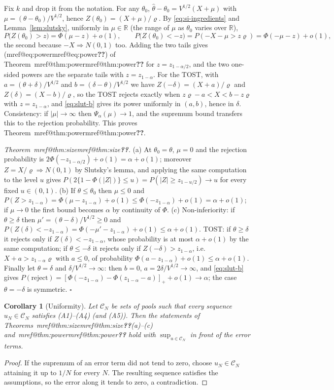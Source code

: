 \documentclass[pdflatex,sn-mathphys-num,iicol]{sn-jnl}
\makeatletter
\theoremstyle{thmstyleone}
\newtheorem{corollary}[proposition]{Corollary}
\theoremstyle{thmstyletwo}
\theoremstyle{thmstylethree}
\newcommand{\Mref}[1]{\ifcsname mref@#1\endcsname\csname mref@#1\endcsname\else\textbf{??}\fi}
\makeatother
\begin{document}
Fix $k$ and drop it from the notation. For any $\theta_0$, $\hat\theta-\theta_0=V^{1/2}(X+\mu)$ with $\mu=(\theta-\theta_0)/V^{1/2}$, hence $Z(\theta_0)=(X+\mu)/\varrho$. By \eqref{eq:si-ingredients} and Lemma~\ref{lem:slutsky}, uniformly in $\mu\in\mathbb R$ (the range of $\mu$ as $\theta_0$ varies over $\mathbb R$),
\[
P\big(Z(\theta_0)>z\big)=\Phi(\mu-z)+o(1),\qquad P\big(Z(\theta_0)<-z\big)=P(-X-\mu>z\varrho)=\Phi(-\mu-z)+o(1),
\]
the second because $-X\Rightarrow N(0,1)$ too. Adding the two tails gives (\Mref{eq:power}) of Theorem~\Mref{thm:power} for $z=z_{1-\alpha/2}$, and the two one-sided powers are the separate tails with $z=z_{1-\alpha}$. For the TOST, with $a=(\theta+\delta)/V^{1/2}$ and $b=(\delta-\theta)/V^{1/2}$ we have $Z(-\delta)=(X+a)/\varrho$ and $Z(\delta)=(X-b)/\varrho$, so the TOST rejects exactly when $z\varrho-a<X<b-z\varrho$ with $z=z_{1-\alpha}$, and \eqref{eq:slut-b} gives its power uniformly in $(a,b)$, hence in $\delta$. Consistency: if $|\mu|\to\infty$ then $\Psi_\alpha(\mu)\to1$, and the supremum bound transfers this to the rejection probability. This proves Theorem~\Mref{thm:power}.

\emph{Theorem~\Mref{thm:size}.} (a) At $\theta_0=\theta$, $\mu=0$ and the rejection probability is $2\Phi(-z_{1-\alpha/2})+o(1)=\alpha+o(1)$; moreover $Z=X/\varrho\Rightarrow N(0,1)$ by Slutsky's lemma, and applying the same computation to the level $u$ gives $P(2\{1-\Phi(|Z|)\}\le u)=P(|Z|\ge z_{1-u/2})\to u$ for every fixed $u\in(0,1)$. (b) If $\theta\le\theta_0$ then $\mu\le0$ and $P(Z>z_{1-\alpha})=\Phi(\mu-z_{1-\alpha})+o(1)\le\Phi(-z_{1-\alpha})+o(1)=\alpha+o(1)$; if $\mu\to0$ the first bound becomes $\alpha$ by continuity of $\Phi$. (c) Non-inferiority: if $\theta\ge\delta$ then $\mu'=(\theta-\delta)/V^{1/2}\ge0$ and $P(Z(\delta)<-z_{1-\alpha})=\Phi(-\mu'-z_{1-\alpha})+o(1)\le\alpha+o(1)$. TOST: if $\theta\ge\delta$ it rejects only if $Z(\delta)<-z_{1-\alpha}$, whose probability is at most $\alpha+o(1)$ by the same computation; if $\theta\le-\delta$ it rejects only if $Z(-\delta)>z_{1-\alpha}$, i.e.\ $X+a>z_{1-\alpha}\varrho$ with $a\le0$, of probability $\Phi(a-z_{1-\alpha})+o(1)\le\alpha+o(1)$. Finally let $\theta=\delta$ and $\delta/V^{1/2}\to\infty$: then $b=0$, $a=2\delta/V^{1/2}\to\infty$, and \eqref{eq:slut-b} gives $P(\text{reject})=[\Phi(-z_{1-\alpha})-\Phi(z_{1-\alpha}-a)]_++o(1)\to\alpha$; the case $\theta=-\delta$ is symmetric. $\square$

\begin{corollary}[Uniformity]\label{cor:uniform}
Let $\mathcal C_N$ be sets of pools such that every sequence $u_N\in\mathcal C_N$ satisfies (A1)--(A4) (and (A5)). Then the statements of Theorems~\Mref{thm:size}(a)--(c) and~\Mref{thm:power} hold with $\sup_{u\in\mathcal C_N}$ in front of the error terms.
\end{corollary}
\begin{proof}
If the supremum of an error term did not tend to zero, choose $u_N\in\mathcal C_N$ attaining it up to $1/N$ for every $N$. The resulting sequence satisfies the assumptions, so the error along it tends to zero, a contradiction.
\end{proof}
\end{document}
